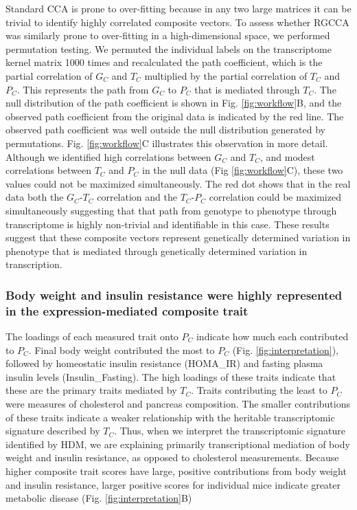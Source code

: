 \documentclass[
]{article}
\begin{document}
Standard CCA is prone to over-fitting because in any two large matrices
it can be trivial to identify highly correlated composite vectors. To
assess whether RGCCA was similarly prone to over-fitting in a
high-dimensional space, we performed permutation testing. We permuted
the individual labels on the transcriptome kernel matrix 1000 times and
recalculated the path coefficient, which is the partial correlation of
\(G_C\) and \(T_C\) multiplied by the partial correlation of \(T_C\) and
\(P_C\). This represents the path from \(G_C\) to \(P_C\) that is
mediated through \(T_C\). The null distribution of the path coefficient
is shown in Fig. \ref{fig:workflow}B, and the observed path coefficient
from the original data is indicated by the red line. The observed path
coefficient was well outside the null distribution generated by
permutations. Fig. \ref{fig:workflow}C illustrates this observation in
more detail. Although we identified high correlations between \(G_C\)
and \(T_C\), and modest correlations between \(T_C\) and \(P_C\) in the
null data (Fig \ref{fig:workflow}C), these two values could not be
maximized simultaneously. The red dot shows that in the real data both
the \(G_C\)-\(T_C\) correlation and the \(T_C\)-\(P_C\) correlation
could be maximized simultaneously suggesting that that path from
genotype to phenotype through transcriptome is highly non-trivial and
identifiable in this case. These results suggest that these composite
vectors represent genetically determined variation in phenotype that is
mediated through genetically determined variation in transcription.

\subsubsection{Body weight and insulin resistance were highly
represented in the expression-mediated composite
trait}\label{body-weight-and-insulin-resistance-were-highly-represented-in-the-expression-mediated-composite-trait}

The loadings of each measured trait onto \(P_C\) indicate how much each
contributed to \(P_C\). Final body weight contributed the most to
\(P_C\) (Fig. \ref{fig:interpretation}), followed by homeostatic insulin
resistance (HOMA\_IR) and fasting plasma insulin levels
(Insulin\_Fasting). The high loadings of these traits indicate that
these are the primary traits mediated by \(T_C\). Traits contributing
the least to \(P_C\) were measures of cholesterol and pancreas
composition. The smaller contributions of these traits indicate a weaker
relationship with the heritable transcriptomic signature described by
\(T_C\). Thus, when we interpret the transcriptomic signature identified
by HDM, we are explaining primarily transcriptional mediation of body
weight and insulin resistance, as opposed to cholesterol measurements.
Because higher composite trait scores have large, positive contributions
from body weight and insulin resistance, larger positive scores for
individual mice indicate greater metabolic disease (Fig.
\ref{fig:interpretation}B)
\end{document}
